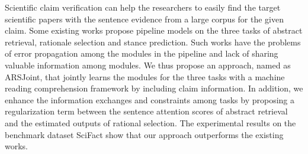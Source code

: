 Scientific claim verification can help the researchers to easily find the target scientific papers with the sentence evidence from a large corpus for the given claim. Some existing works propose pipeline models on the three tasks of abstract retrieval, rationale selection and stance prediction. Such works have the problems of error propagation among the modules in the pipeline and lack of sharing valuable information among modules. We thus propose an approach, named as ARSJoint, that jointly learns the modules for the three tasks with a machine reading comprehension framework by including claim information. In addition, we enhance the information exchanges and constraints among tasks by proposing a regularization term between the sentence attention scores of abstract retrieval and the estimated outputs of rational selection. The experimental results on the benchmark dataset SciFact show that our approach outperforms the existing works.
